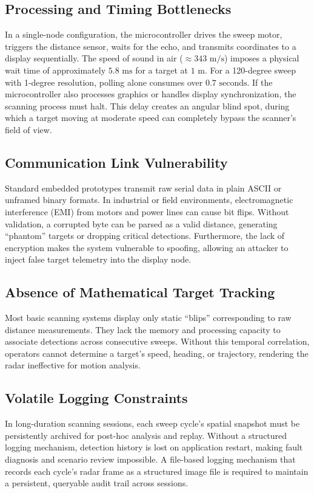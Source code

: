 \documentclass[conference]{IEEEtran}
\begin{document}
\subsection{Processing and Timing Bottlenecks}
In a single-node configuration, the microcontroller drives the sweep motor, triggers the distance sensor, waits for the echo, and transmits coordinates to a display sequentially. The speed of sound in air ($\approx 343\text{ m/s}$) imposes a physical wait time of approximately $5.8\text{ ms}$ for a target at $1\text{ m}$. For a 120-degree sweep with 1-degree resolution, polling alone consumes over $0.7\text{ seconds}$. If the microcontroller also processes graphics or handles display synchronization, the scanning process must halt. This delay creates an angular blind spot, during which a target moving at moderate speed can completely bypass the scanner's field of view.

\subsection{Communication Link Vulnerability}
Standard embedded prototypes transmit raw serial data in plain ASCII or unframed binary formats. In industrial or field environments, electromagnetic interference (EMI) from motors and power lines can cause bit flips. Without validation, a corrupted byte can be parsed as a valid distance, generating ``phantom'' targets or dropping critical detections. Furthermore, the lack of encryption makes the system vulnerable to spoofing, allowing an attacker to inject false target telemetry into the display node.

\subsection{Absence of Mathematical Target Tracking}
Most basic scanning systems display only static ``blips'' corresponding to raw distance measurements. They lack the memory and processing capacity to associate detections across consecutive sweeps. Without this temporal correlation, operators cannot determine a target's speed, heading, or trajectory, rendering the radar ineffective for motion analysis.

\subsection{Volatile Logging Constraints}
In long-duration scanning sessions, each sweep cycle's spatial snapshot must be persistently archived for post-hoc analysis and replay. Without a structured logging mechanism, detection history is lost on application restart, making fault diagnosis and scenario review impossible. A file-based logging mechanism that records each cycle's radar frame as a structured image file is required to maintain a persistent, queryable audit trail across sessions.
\end{document}
